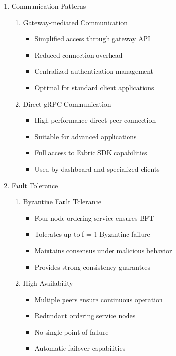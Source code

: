\documentclass[conference]{IEEEtran}
\begin{document}
\begin{enumerate}[itemsep=2ex, parsep=1ex]
	\item{Communication Patterns}
		
	\begin{enumerate}
		\item Gateway-mediated Communication
		      \begin{itemize}[itemsep=0.5pt, parsep=0.5pt]
		      	\item Simplified access through gateway API
		      	\item Reduced connection overhead
		      	\item Centralized authentication management
		      	\item Optimal for standard client applications
		      \end{itemize}
		      		      
		\item Direct gRPC Communication
		      \begin{itemize}[itemsep=0.5pt, parsep=0.5pt]
		      	\item High-performance direct peer connection
		      	\item Suitable for advanced applications
		      	\item Full access to Fabric SDK capabilities
		      	\item Used by dashboard and specialized clients
		      \end{itemize}
	\end{enumerate}
		
	\item{Fault Tolerance}
		
	\begin{enumerate}
		\item Byzantine Fault Tolerance
		      \begin{itemize}[itemsep=0.5pt, parsep=0.5pt]
		      	\item Four-node ordering service ensures BFT
		      	\item Tolerates up to f = 1 Byzantine failure
		      	\item Maintains consensus under malicious behavior
		      	\item Provides strong consistency guarantees
		      \end{itemize}
		      		      
		\item High Availability
		      \begin{itemize}[itemsep=0.5pt, parsep=0.5pt]
		      	\item Multiple peers ensure continuous operation
		      	\item Redundant ordering service nodes
		      	\item No single point of failure
		      	\item Automatic failover capabilities
		      \end{itemize}
	\end{enumerate}
\end{enumerate}
\end{document}
